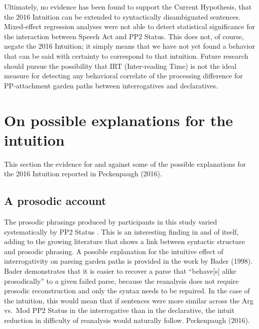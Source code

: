 \documentclass[12pt,oneside]{book}
\begin{document}

Ultimately, no evidence has been found to support the Current Hypothesis, that the 2016 Intuition can be extended to syntactically disambiguated sentences. Mixed-effect regression analyses were not able to detect statistical significance for the interaction between Speech Act and PP2 Status. This does not, of course, negate the 2016 Intuition; it simply means that we have not yet found a behavior that can be said with certainty to correspond to that intuition. Future research should pursue the possibility that IRT (Inter-reading Time) is not the ideal measure for detecting any behavioral correlate of the processing difference for PP-attachment garden paths between interrogatives and declaratives.

\hypertarget{on-possible-explanations-for-the-intuition}{%
\section{On possible explanations for the intuition}\label{on-possible-explanations-for-the-intuition}}

This section  the evidence for and against some of the possible explanations for the 2016 Intuition reported in Peckenpaugh (2016). 

\hypertarget{prep}{%
\subsection{A prosodic account}\label{prep}}

The prosodic phrasings produced by participants in this study varied systematically by PP2 Status . This is an interesting finding in and of itself, adding to the growing literature that shows a link between syntactic structure and prosodic phrasing. A possible explanation for the intuitive effect of interrogativity on parsing garden paths is provided in the work by Bader (1998). Bader demonstrates that it is easier to recover  a  parse that ``behave{[}s{]} alike prosodically'' to a given failed parse, because the reanalysis does not require prosodic reconstruction and only the syntax needs to be repaired. In the case of the  intuition, this would mean that if  sentences were more  similar across the Arg vs.~Mod PP2 Status in the interrogative than in the declarative, the intuit reduction in difficulty of reanalysis would naturally follow.  Peckenpaugh (2016).
\end{document}
